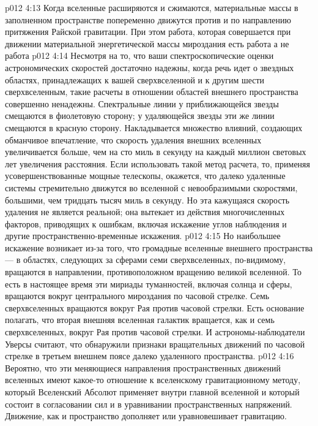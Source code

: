 \vs p012 4:13 Когда вселенные расширяются и сжимаются, материальные массы в заполненном пространстве попеременно движутся против и по направлению притяжения Райской гравитации. При этом работа, которая совершается при движении материальной энергетической массы мироздания есть работа  а не работа 
\vs p012 4:14 \pc Несмотря на то, что ваши спектроскопические оценки астрономических скоростей достаточно надежны, когда речь идет о звездных областях, принадлежащих к вашей сверхвселенной и к другим шести сверхвселенным, такие расчеты в отношении областей внешнего пространства совершенно ненадежны. Спектральные линии у приближающейся звезды смещаются в фиолетовую сторону; у удаляющейся звезды эти же линии смещаются в красную сторону. Накладывается множество влияний, создающих обманчивое впечатление, что скорость удаления внешних вселенных увеличивается больше, чем на сто миль в секунду на каждый миллион световых лет увеличения расстояния. Если использовать такой метод расчета, то, применяя усовершенствованные мощные телескопы, окажется, что далеко удаленные системы стремительно движутся во вселенной с невообразимыми скоростями, большими, чем тридцать тысяч миль в секунду. Но эта кажущаяся скорость удаления не является реальной; она вытекает из действия многочисленных факторов, приводящих к ошибкам, включая искажение углов наблюдения и другие пространственно\hyp{}временные искажения.
\vs p012 4:15 Но наибольшее искажение возникает из\hyp{}за того, что громадные вселенные внешнего пространства --- в областях, следующих за сферами семи сверхвселенных, по\hyp{}видимому, вращаются в направлении, противоположном вращению великой вселенной. То есть в настоящее время эти мириады туманностей, включая солнца и сферы, вращаются вокруг центрального мироздания по часовой стрелке. Семь сверхвселенных вращаются вокруг Рая против часовой стрелки. Есть основание полагать, что вторая внешняя вселенная галактик вращается, как и семь сверхвселенных, вокруг Рая против часовой стрелки. И астрономы\hyp{}наблюдатели Уверсы считают, что обнаружили признаки вращательных движений по часовой стрелке в третьем внешнем поясе далеко удаленного пространства.
\vs p012 4:16 Вероятно, что эти меняющиеся направления пространственных движений вселенных имеют какое\hyp{}то отношение к вселенскому гравитационному методу, который Вселенский Абсолют применяет внутри главной вселенной и который состоит в согласовании сил и в уравнивании пространственных напряжений. Движение, как и пространство дополняет или уравновешивает гравитацию.
